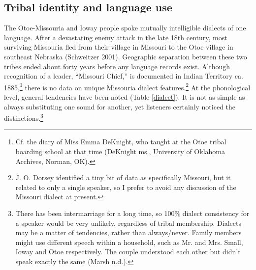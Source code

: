 \documentclass[output=paper]{LSP/langsci}
\begin{document}
\subsection{Tribal identity and language use} 	The Otoe-Missouria and Ioway people spoke mutually intelligible dialects of one language.  After a devastating enemy attack in the late 18th century, most surviving Missouria fled from their village in Missouri to the Otoe village in southeast Nebraska (Schweitzer 2001).  Geographic separation between these two tribes ended about forty years before any language records exist.  Although recognition of a leader, ``Missouri Chief,'' is documented in Indian Territory ca. 1885,\footnote{Cf. the diary of Miss Emma DeKnight, who taught at the Otoe tribal boarding school at that time (DeKnight ms., University of Oklahoma Archives, Norman, OK).}  there is no data on unique Missouria dialect features.\footnote{J. O. Dorsey identified a tiny bit of data as specifically Missouri, but it related to only a single speaker, so I prefer to avoid any discussion of the Missouri dialect at present.}  At the phonological level, general tendencies have been noted (Table \ref{dialect}). It is not as simple as always substituting one sound for another, yet listeners certainly noticed the distinctions.\footnote{There has been intermarriage for a long time, so 100\% dialect consistency for a speaker would be very unlikely, regardless of tribal membership. Dialects may be a matter of tendencies, rather than always/never. Family members might use different speech within a household, such as Mr. and Mrs. Small, Ioway and Otoe respectively. The couple understood each other but didn't speak exactly the same (Marsh n.d.).}	
\end{document}
